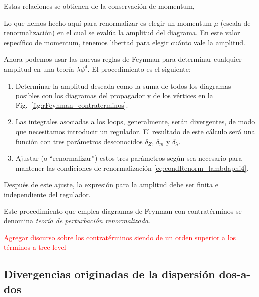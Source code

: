 Estas relaciones se obtienen de la conservación de momentum,
%

Lo que hemos hecho aquí para renormalizar es elegir un momentum $\mu$ (escala de renormalización) en el cual se evalúa la amplitud del diagrama. En este valor específico de momentum, tenemos libertad para elegir cuánto vale la amplitud. 

Ahora podemos usar las nuevas reglas de Feynman para determinar cualquier amplitud en una teoría $\lambda \phi^4$. El procedimiento es el siguiente: 

\begin{enumerate}
	\item Determinar la amplitud deseada como la suma de todos los diagramas posibles con los diagramas del propagador y de los vértices en la Fig.~\ref{fig:rFeynman_contraterminos}.
	
	\item Las integrales asociadas a los loops, generalmente, serán divergentes, de modo que necesitamos introducir un regulador. El resultado de este cálculo será una función con tres parámetros desconocidos $\delta_Z,\, \delta_m$ y $\delta_\lambda$.
	
	\item Ajustar (o ``renormalizar'') estos tres parámetros según sea necesario para mantener las condiciones de renormalización \eqref{eq:condRenorm_lambdaphi4}.
\end{enumerate}

   Después de este ajuste, la expresión para la amplitud debe ser finita e independiente del regulador.

Este procedimiento que emplea diagramas de Feynman con contratérminos se denomina \emph{teoría de perturbación renormalizada}.


\textcolor{red}{Agregar discurso sobre los contratérminos siendo de un orden superior a los términos a tree-level}



\subsection{Divergencias originadas de la dispersión dos-a-dos}


